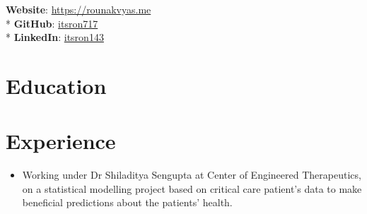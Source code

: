 \documentclass[11pt,a4paper,sans]{moderncv} %
\begin{document}
\makecvtitle %


\textbf{Website}: \href{https://rounakvyas.me}{https://rounakvyas.me} \\*
\textbf{GitHub}: \href{https://github.com/itsron717}{itsron717} \\*
\textbf{LinkedIn}: \href{https://www.linkedin.com/in/itsron143/}{itsron143} 


\section{Education}




\section{Experience}
{
\begin{itemize}
    \item Working under Dr Shiladitya Sengupta at Center of Engineered Therapeutics, on a statistical modelling project based on critical care patient's data to make beneficial predictions about the patients' health.
\end{itemize}
}
\end{document}
